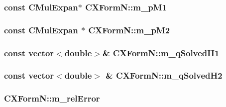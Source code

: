 \hypertarget{classCXFormN_ad5bac4096494726a30b968d16b37a8c6}{
\subsubsection[{m\-\_\-p\-M1}]{\setlength{\rightskip}{0pt plus 5cm}const {\bf C\-Mul\-Expan}$\ast$ C\-X\-Form\-N\-::m\-\_\-p\-M1\hspace{0.3cm}{\ttfamily [protected]}}}\label{classCXFormN_ad5bac4096494726a30b968d16b37a8c6}
\hypertarget{classCXFormN_a049b428205fa09f8c3699b2a5e6a11e9}{
\subsubsection[{m\-\_\-p\-M2}]{\setlength{\rightskip}{0pt plus 5cm}const {\bf C\-Mul\-Expan} $\ast$ C\-X\-Form\-N\-::m\-\_\-p\-M2\hspace{0.3cm}{\ttfamily [protected]}}}\label{classCXFormN_a049b428205fa09f8c3699b2a5e6a11e9}
\hypertarget{classCXFormN_ade4e835cb0f6dba67e81111c56da5180}{
\subsubsection[{m\-\_\-q\-Solved\-H1}]{\setlength{\rightskip}{0pt plus 5cm}const vector$<$double$>$\& C\-X\-Form\-N\-::m\-\_\-q\-Solved\-H1\hspace{0.3cm}{\ttfamily [protected]}}}\label{classCXFormN_ade4e835cb0f6dba67e81111c56da5180}
\hypertarget{classCXFormN_a431ca150845793df8990f605c56e70fc}{
\subsubsection[{m\-\_\-q\-Solved\-H2}]{\setlength{\rightskip}{0pt plus 5cm}const vector$<$double$>$ \& C\-X\-Form\-N\-::m\-\_\-q\-Solved\-H2\hspace{0.3cm}{\ttfamily [protected]}}}\label{classCXFormN_a431ca150845793df8990f605c56e70fc}
\hypertarget{classCXFormN_a995b3cf2414f9485de231271b8ab3ba2}{
\subsubsection[{m\-\_\-rel\-Error}]{ C\-X\-Form\-N\-::m\-\_\-rel\-Error\hspace{0.3cm}{\ttfamily [protected]}}}\label{classCXFormN_a995b3cf2414f9485de231271b8ab3ba2}
